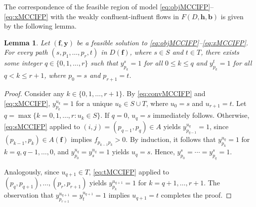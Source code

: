\documentclass[pdflatex,sn-mathphys-num]{sn-jnl}%
\theoremstyle{thmstyleone}%
\newtheorem{lemma}[theorem]{Lemma}%
\begin{document}
The correspondence of the feasible region of model \eqref{eq:objMCCIFP}--\eqref{eq:xMCCIFP} with the  weakly confluent-influent flows in $F(D,\boldsymbol{h},\boldsymbol{b})$ is given by the following lemma. 
\begin{lemma} \label{lem:MCCIFP}
Let $(\boldsymbol{f},\boldsymbol{y})$ be a feasible solution to \eqref{eq:objMCCIFP}--\eqref{eq:xMCCIFP}.
For every path $(s,p_1,\ldots,p_r,t)$ in $D(\boldsymbol{f})$, where $s\in S$ and $t\in T$,
there exists some integer $q\in\{0,1,\ldots,r\}$ such that $y_{p_k}^s=1$ for all $0\leq k\leq q$ and $y_{p_k}^t=1$ for all $q<k\leq r+1$, where $p_0=s$ and $p_{r+1}=t$.
\end{lemma}
\begin{proof}
Consider any $k\in\{0,1,\ldots,r+1\}$.
By \eqref{eq:convMCCIFP} and \eqref{eq:xMCCIFP}, $y_{p_k}^{u_k}=1$ for a unique $u_k\in S\cup T$, where $u_0=s$ and $u_{r+1}=t$.
Let $q=\max\{k=0,1,\ldots,r: u_k\in S\}$.
If $q=0$, $u_q=s$ immediately follows.
Otherwise, \eqref{eq:sMCCIFP} applied to $(i,j)=(p_{q-1},p_q)\in A$ yields $y_{p_{q-1}}^{u_q}=1$, since $(p_{k-1},p_k)\in A(\boldsymbol{f})$ implies $f_{p_{k-1}p_k}>0$.
By induction, it follows that $y_{p_k}^{u_q}=1$ for $k=q,q-1,\ldots,0$, and $y_{p_0}^{u_q}=y_s^{u_q}=1$ yields $u_q=s$.
Hence, $y_{p_0}^s=\cdots=y_{p_q}^s=1$.

Analogously, since $u_{q+1}\in T$, \eqref{eq:tMCCIFP} applied to $(p_q,p_{q+1}),\ldots,(p_r,p_{r+1})$ yields $y_{p_k}^{u_{q+1}}=1$ for $k=q+1,\ldots,r+1$.
The observation that $y_{p_{r+1}}^{u_{q+1}}=y_{t}^{u_{q+1}}=1$ implies $u_{q+1}=t$ completes the proof.
\end{proof}
\end{document}
